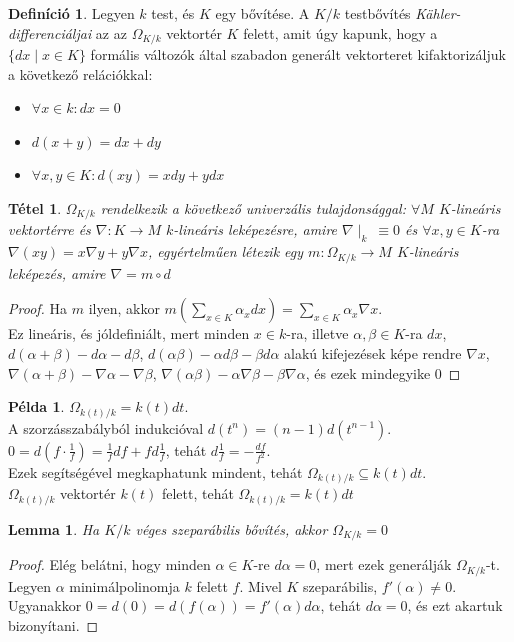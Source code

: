 \documentclass[11pt]{article}
\newtheorem*{theorem}{Tétel}
\newtheorem*{lemma}{Lemma}
\theoremstyle{definition}
\newtheorem*{definition}{Definíció}
\newtheorem*{example}{Példa}
\begin{document}
\begin{definition} Legyen $k$ test, és $K$ egy bővítése. A $K/k$ testbővítés \textit{Kähler-differenciáljai} az az $\Omega_{K/k}$ vektortér $K$ felett, amit úgy kapunk, hogy a $\{dx\mid x\in K\}$ formális változók által szabadon generált vektorteret kifaktorizáljuk a következő relációkkal:
\begin{itemize}
    \item $\forall x\in k:dx=0$
    \item $d(x+y) = dx +dy$
    \item $\forall x, y\in K: d(xy)=xdy+ydx$
\end{itemize}
\end{definition}

\begin{theorem} $\Omega_{K/k}$ rendelkezik a következő univerzális tulajdonsággal: $\forall M$ $K$-lineáris vektortérre és $\nabla:K\rightarrow M$ $k$-lineáris leképezésre, amire $\nabla\mid_k\:\equiv 0$ és $\forall x, y\in K$-ra $\nabla(xy)=x\nabla y+y\nabla x$, egyértelműen létezik egy $m:\Omega_{K/k}\rightarrow M$ $K$-lineáris leképezés, amire $\nabla = m\circ d$
\end{theorem}
\begin{proof} Ha $m$ ilyen, akkor $m(\sum_{x\in K}\alpha_xdx)=\sum_{x\in K}\alpha_x\nabla x$.
\\Ez lineáris, és jóldefiniált, mert minden $x\in k$-ra, illetve $\alpha,\beta\in K$-ra $dx$, $d(\alpha+\beta)-d\alpha - d\beta$, $d(\alpha\beta)-\alpha d\beta-\beta d\alpha$ alakú kifejezések képe rendre $\nabla x$, $\nabla(\alpha+\beta)-\nabla\alpha - \nabla\beta$, $\nabla(\alpha\beta)-\alpha\nabla\beta-\beta\nabla\alpha$, és ezek mindegyike $0$ 
\end{proof}

\begin{example}
$\Omega_{k(t)/k}=k(t)dt$.
\\A szorzásszabályból indukcióval $d(t^n)=(n-1)d(t^{n-1})$.
\\$0=d(f\cdot \frac1f)=\frac1fdf+fd\frac1f$, tehát $d\frac1f=-\frac{df}{f^2}$.
\\Ezek segítségével megkaphatunk mindent, tehát $\Omega_{k(t)/k}\subseteq k(t)dt$.
\\$\Omega_{k(t)/k}$ vektortér $k(t)$ felett, tehát $\Omega_{k(t)/k} = k(t)dt$  
\end{example}

\begin{lemma} Ha $K/k$ véges szeparábilis bővítés, akkor $\Omega_{K/k}=0$
\end{lemma}
\begin{proof} Elég belátni, hogy minden $\alpha\in K$-re $d\alpha=0$, mert ezek generálják $\Omega_{K/k}$-t. 
\\Legyen $\alpha$ minimálpolinomja $k$ felett $f$. Mivel $K$ szeparábilis, $f'(\alpha)\neq0$.
\\Ugyanakkor $0=d(0)=d(f(\alpha)) = f'(\alpha)d\alpha$, tehát $d\alpha=0$, és ezt akartuk bizonyítani.
\end{proof}
\end{document}

